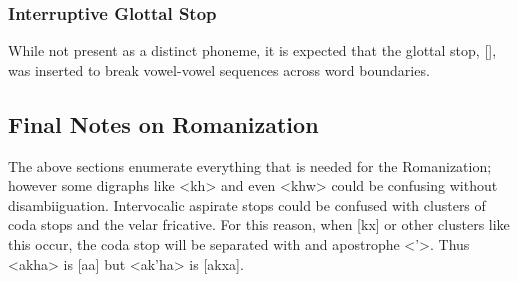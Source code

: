   \subsubsection{Interruptive Glottal Stop}
  While not present as a distinct phoneme, it is expected that the glottal stop, [], was inserted to break vowel-vowel sequences across word boundaries.

\subsection{Final Notes on Romanization}
  The above sections enumerate everything that is needed for the Romanization; however some digraphs like <kh> and even <khw> could be confusing without disambiiguation. Intervocalic aspirate stops could be confused with clusters of coda stops and the velar fricative. For this reason, when [kx] or other clusters like this occur, the coda stop will be separated with and apostrophe <'>. Thus <akha> is [a\taspk a] but <ak'ha> is [akxa].
